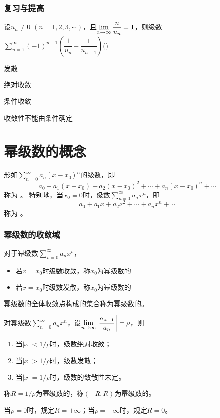 \documentclass[14pt,notheorems,leqno,xcolor={rgb}]{beamer} %
\begin{document}
\begin{frame}
\frametitle{复习与提高}
\begin{choice}
设$u_n\neq0$ $(n=1,2,3,\cdots)$，且$\lim\limits_{n\to\infty}\dfrac{n}{u_n}=1$，则级数
$\sum\limits_{n=1}^{\infty}(-1)^{n+1}\left(\dfrac{1}{u_n}+\dfrac{1}{u_{n+1}}\right)$\dotfill()
\begin{choicehalf}
  \item 发散 ~
  \item 绝对收敛 ~
  \item 条件收敛 ~
  \item 收敛性不能由条件确定 ~
\end{choicehalf}
\end{choice}
\end{frame}

\section{幂级数的概念}

\begin{frame}
\begin{definition}
形如$\sum\limits_{n=0}^{\infty}a_n(x-x_0)^n$的级数，即
\[ a_0 + a_1(x-x_0) + a_2(x-x_0)^2 + \cdots + a_n(x-x_0)^n + \cdots \]
称为 。\ppause
特别地，当$x_0=0$时，级数$\sum\limits_{n=0}^{\infty}a_nx^n$，即
\[a_0+a_1x+a_2x^2+\cdots+a_nx^n+\cdots\]
称为 。
\end{definition}
\end{frame}

\begin{frame}
\frametitle{幂级数的收敛域}
对于幂级数$\sum\limits_{n=0}^{\infty}a_nx^n$，
\begin{itemize}
  \item 若$x=x_0$时级数收敛，称$x_0$为幂级数的\pause
  \item 若$x=x_0$时级数发散，称$x_0$为幂级数的
\end{itemize}
\pause
幂级数的全体收敛点构成的集合称为幂级数的。
\end{frame}

\begin{frame}
\begin{theorem}
对幂级数$\sum\limits_{n=0}^{\infty}a_nx^n$，设$\lim\limits_{n\to\infty}\left|\dfrac{a_{n+1}}{a_n}\right|=\rho$，则
\pause
\begin{enumerate}[<+->]
  \item 当$|x|<1/\rho$时，级数绝对收敛；
  \item 当$|x|>1/\rho$时，级数发散；
  \item 当$|x|=1/\rho$时，级数的敛散性未定。
\end{enumerate}
\end{theorem}
\vpause
\begin{definition*}
称$R=1/\rho$为幂级数的，称$(-R,R)$为幂级数的。
\end{definition*}
\vpause
\begin{remark*}
当$\rho=0$时，规定$R=+\infty$；当$\rho=+\infty$时，规定$R=0$。
\end{remark*}
\end{frame}
\end{document}
